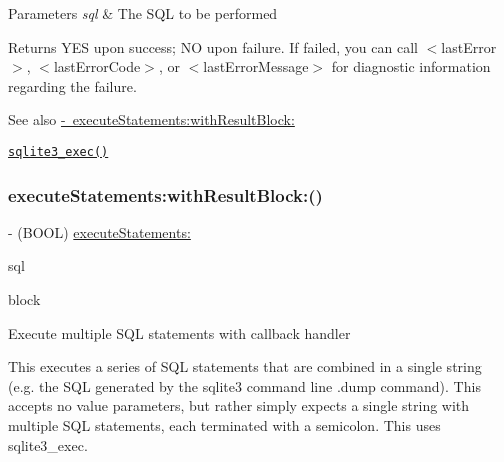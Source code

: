 \begin{DoxyParams}{Parameters}
{\em sql} & The S\+QL to be performed\\
\hline
\end{DoxyParams}
\begin{DoxyReturn}{Returns}
{\ttfamily Y\+ES} upon success; {\ttfamily NO} upon failure. If failed, you can call {\ttfamily $<$last\+Error$>$}, {\ttfamily $<$last\+Error\+Code$>$}, or {\ttfamily $<$last\+Error\+Message$>$} for diagnostic information regarding the failure.
\end{DoxyReturn}
\begin{DoxySeeAlso}{See also}
\mbox{\hyperlink{interface_o_p_t_l_y_f_m_d_b_database_a11d5b1db0e9be3d5a0fb68d1c4bac0e3}{-\/ execute\+Statements\+:with\+Result\+Block\+:}} 

\href{http://sqlite.org/c3ref/exec.html}{\tt sqlite3\+\_\+exec()} 
\end{DoxySeeAlso}
\mbox{\label{interface_o_p_t_l_y_f_m_d_b_database_a11d5b1db0e9be3d5a0fb68d1c4bac0e3}} 
\subsubsection{\texorpdfstring{execute\+Statements\+:with\+Result\+Block\+:()}{executeStatements:withResultBlock:()}}
{\footnotesize\ttfamily -\/ (B\+O\+OL) \mbox{\hyperlink{interface_o_p_t_l_y_f_m_d_b_database_ad8c3bdc64c602dac7827a4f560928168}{execute\+Statements\+:}} \begin{DoxyParamCaption}\item[{(N\+S\+String $\ast$)}]{sql }\item[{withResultBlock:(\+\_\+\+\_\+attribute\+\_\+\+\_\+((noescape)) O\+P\+T\+L\+Y\+F\+M\+D\+B\+Execute\+Statements\+Callback\+Block \+\_\+\+Nullable)}]{block }\end{DoxyParamCaption}}

Execute multiple S\+QL statements with callback handler

This executes a series of S\+QL statements that are combined in a single string (e.\+g. the S\+QL generated by the {\ttfamily sqlite3} command line {\ttfamily .dump} command). This accepts no value parameters, but rather simply expects a single string with multiple S\+QL statements, each terminated with a semicolon. This uses {\ttfamily sqlite3\+\_\+exec}.



